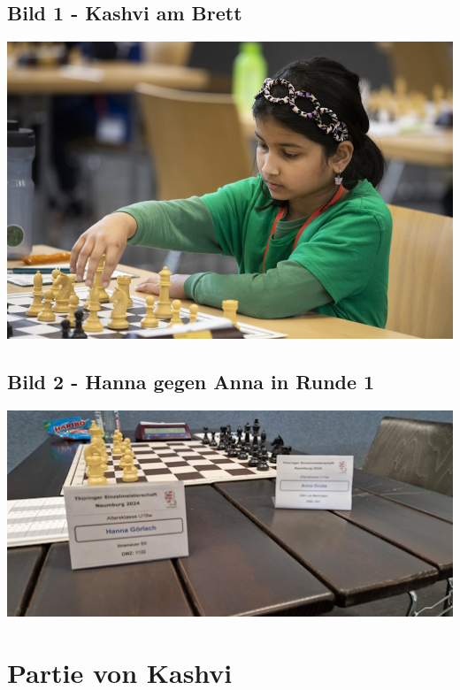 \subsection{Bild 1 - Kashvi am Brett}
\begin{center}
    \includegraphics[width=\linewidth,height=0.5625\linewidth,keepaspectratio]{THJEM2.jpg}
    \label{fig:Kashvi Bild}
\end{center}

\subsection{Bild 2 - Hanna gegen Anna in Runde 1}
\begin{center}
    \includegraphics[width=0.8\linewidth,height=0.45\linewidth,keepaspectratio]{THJEM1.jpeg}
    \label{fig:THJEM Hanna Schild}
\end{center}

\clearpage
\section{Partie von Kashvi}
